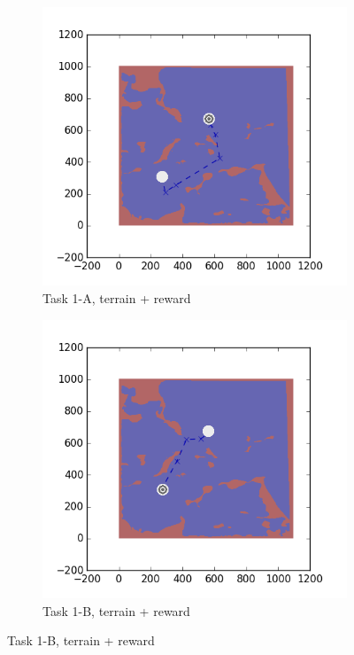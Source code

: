 \documentclass{tamuccthesis}
\begin{document}
\begin{figure}[H]
    \begin{subfigure}[b]{0.4\textwidth}
        \centering
        \includegraphics[width=\textwidth,trim={3cm 3cm 3cm 3cm},clip]{EXP3RG_PathAa_-1_-1_0_-1.png}
        \caption{{\small Task 1-A, terrain + reward}}    
        \label{fig:Path_1-A_terrain_reward}
    \end{subfigure}
    \hfill
    \begin{subfigure}[b]{0.4\textwidth}  
        \centering 
        \includegraphics[width=\textwidth,trim={3cm 3cm 3cm 3cm},clip]{EXP3RG_PathAb_-1_-1_0_-1.png}
        \caption{{\small Task 1-B, terrain + reward}}   
        \label{fig:Path_1-B_terrain_reward}
    \end{subfigure}
   

\end{figure}
\end{document}
